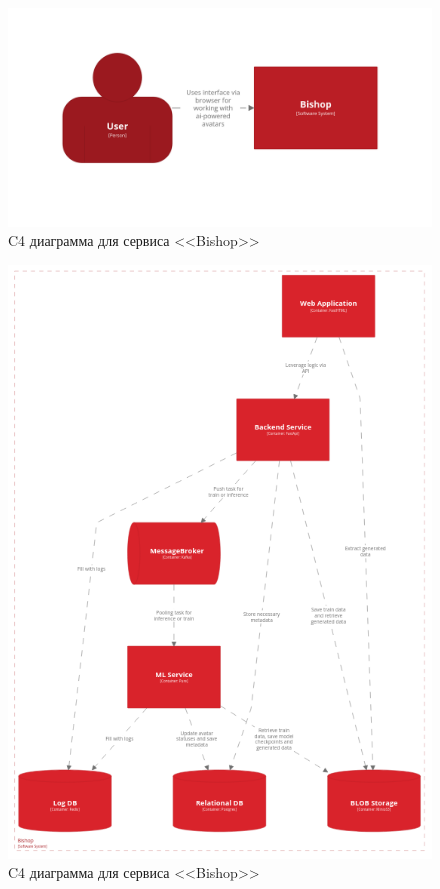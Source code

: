 \begin{figure}
    \centering
    \includegraphics[width=1.0\linewidth]{images/c4-general.png}
    \caption{C4 диаграмма для сервиса <<Bishop>>}
    \label{fig:c4-bishop-1}
\end{figure}

\begin{figure}
    \centering
    \includegraphics[width=1.0\linewidth]{images/c4-bishop.png}
    \caption{C4 диаграмма для сервиса <<Bishop>>}
    \label{fig:c4-bishop}
\end{figure}
